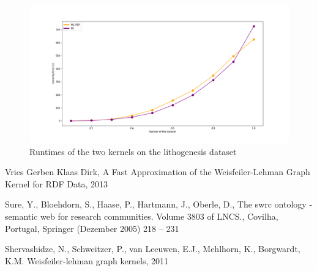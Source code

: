 \documentclass[12pt]{scrartcl}
\begin{document}
\begin{center}
\begin{figure}[h]
\caption{Runtimes of the two kernels on the lithogenesis dataset}
\includegraphics[width=\textwidth]{img/lithogenesis_timing.png}
\end{figure}
\end{center}

\newpage

\begin{thebibliography}{9}

    Vries Gerben Klaas Dirk,
    A Fast Approximation of the Weisfeiler-Lehman Graph Kernel for RDF Data,
    2013

    Sure, Y., Bloehdorn, S., Haase, P., Hartmann, J., Oberle, D.,
    The swrc ontology - semantic web for research communities.
    Volume 3803 of LNCS., Covilha,
    Portugal, Springer (Dezember 2005) 218 – 231

    Shervashidze, N., Schweitzer, P., van Leeuwen, E.J., Mehlhorn, K., Borgwardt, K.M.
    Weisfeiler-lehman graph kernels,
    2011

\end{thebibliography}
\end{document}
